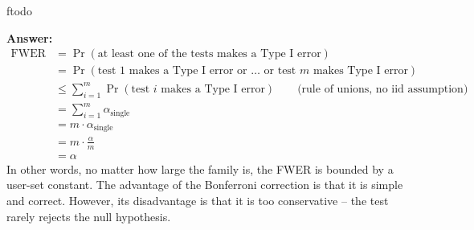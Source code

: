 ƒtodo\documentclass{article}
\newenvironment{QandA}{\begin{enumerate}[label=\arabic*.]}{\end{enumerate}}
\newenvironment{InnerQandA}{\begin{enumerate}[label=\roman*.]}{\end{enumerate}}
\newenvironment{answer}{\par\normalfont \textbf{Answer:}}{}
\begin{document}
\begin{QandA}
\begin{InnerQandA}
\begin{answer}
            \begin{align*}
                \text{FWER} &= \Pr (\text{at least one of the tests makes a Type I error}) \\
                &= \Pr(\text{test } 1 \text{ makes a Type I error or }\ldots \text{ or test } m \text{ makes Type I error}) \\
                &\le \sum_{i=1}^m \Pr (\text{test } i \text{ makes a Type I error}) \quad\quad \text{(rule of unions, no iid assumption)} \\
                &= \sum_{i=1}^m \alpha_{\text{single}} \\
                &= m \cdot \alpha_{\text{single}} \\
                &= m \cdot \frac{\alpha}{m} \\
                &= \alpha
            \end{align*}
            In other words, no matter how large the family is, the FWER is bounded by a user-set constant. The advantage of the Bonferroni correction is that it is simple and correct. However, its disadvantage is that it is too conservative -- the test rarely rejects the null hypothesis.
        \end{answer}
    \end{InnerQandA}


\end{QandA}
\end{document}
